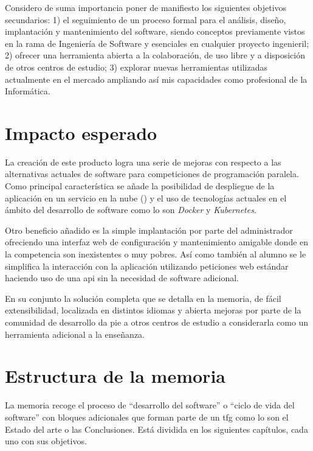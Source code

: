 \documentclass[11pt,spanish,listoffigures,listoftables]{tfgetsinf}
\begin{document}
Considero de suma importancia poner de manifiesto los siguientes objetivos secundarios: 1) el seguimiento de un proceso formal para el análisis, diseño, implantación y mantenimiento del software, siendo conceptos previamente vistos en la rama de Ingeniería de Software y esenciales en cualquier proyecto ingenieril; 2) ofrecer una herramienta  abierta a la colaboración, de uso libre y a disposición de otros centros de estudio; 3) explorar nuevas herramientas utilizadas actualmente en el mercado ampliando así mis capacidades como profesional de la Informática.

\section{Impacto esperado}

La creación de este producto logra una serie de mejoras con respecto a las alternativas actuales de software para competiciones de programación paralela. Como principal característica se añade la posibilidad de despliegue de la aplicación en un servicio en la nube () y el uso de tecnologías actuales en el ámbito del desarrollo de software como lo son \textit{Docker} y \textit{Kubernetes}.

Otro beneficio añadido es la simple implantación por parte del \gls{administrador} ofreciendo una interfaz web de configuración y mantenimiento amigable donde en la competencia son inexistentes o muy pobres. Así como también al \gls{alumno} se le simplifica la interacción con la aplicación utilizando peticiones web estándar haciendo uso de una \acrshort{api} sin la necesidad de software adicional.

En su conjunto la solución completa que se detalla en la memoria, de fácil extensibilidad, localizada en distintos idiomas y abierta mejoras por parte de la comunidad de desarrollo da pie a otros centros de estudio a considerarla como un herramienta adicional a la enseñanza.

\section{Estructura de la memoria}

La memoria recoge el proceso de ``desarrollo del software'' o ``ciclo de vida del software'' con bloques adicionales que forman parte de un \acrshort{tfg} como lo son el Estado del arte o las Conclusiones. Está dividida en los siguientes capítulos, cada uno con sus objetivos.
\end{document}

